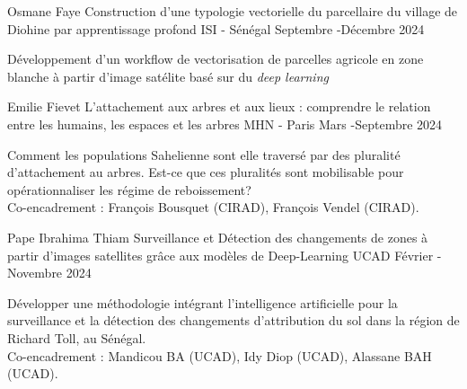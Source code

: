 \vspace{2em}
\vspace{1em}
\begin{cventries}
  \cventry
      {Osmane Faye} %
      {Construction d'une typologie vectorielle du parcellaire du village de Diohine par apprentissage profond} %
      {ISI - Sénégal} %
      {Septembre -Décembre 2024} %
      {
      \begin{cvitems} %
        Développement d'un workflow de vectorisation de parcelles agricole en zone blanche à partir d'image satélite basé sur du \textit{deep learning}\\
      \end{cvitems}
      }
  \cventry
      {Emilie Fievet} %
      {L’attachement aux arbres et aux lieux : comprendre le relation entre les humains, les espaces et les arbres} %
      {MHN - Paris} %
      {Mars -Septembre 2024} %
      {
      \begin{cvitems} %
        Comment les populations Sahelienne sont elle traversé par des pluralité d'attachement au arbres. Est-ce que ces pluralités sont mobilisable pour opérationnaliser les régime de reboissement?\\
          Co-encadrement : François Bousquet (CIRAD), François Vendel (CIRAD).
      \end{cvitems}
      }

    \cventry
        {Pape Ibrahima Thiam} %
        {Surveillance et Détection des changements de zones à partir d’images satellites grâce aux modèles de Deep-Learning} %
        {UCAD } %
        {Février - Novembre 2024} %
        {
        \begin{cvitems} %
          Développer une méthodologie intégrant l’intelligence artificielle pour la surveillance et la détection des changements d'attribution du sol dans la région de Richard Toll, au Sénégal.\\
            Co-encadrement : Mandicou BA (UCAD), Idy Diop (UCAD), Alassane BAH (UCAD).
        \end{cvitems}
        }



\end{cventries}
